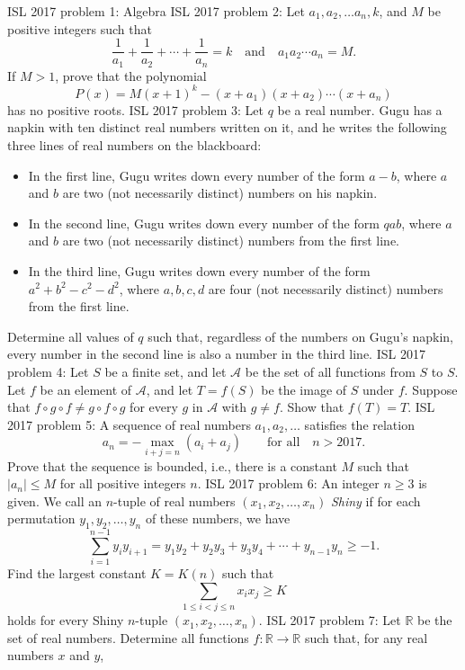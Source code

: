 ISL 2017 problem 1:  Algebra 
ISL 2017 problem 2:  Let $a_1,a_2,\ldots a_n,k$, and $M$ be positive integers such that
\[ \frac{1}{a_1}+\frac{1}{a_2}+\cdots+\frac{1}{a_n}=k\quad\text{and}\quad a_1a_2\cdots a_n=M. \]
If $M>1$, prove that the polynomial
\[ P(x)=M(x+1)^k-(x+a_1)(x+a_2)\cdots (x+a_n) \]
has no positive roots. 
ISL 2017 problem 3:  Let $q$ be a real number. Gugu has a napkin with ten distinct real numbers written on it, and he writes the following three lines of real numbers on the blackboard:
\begin{itemize}
  \item In the first line, Gugu writes down every number of the form $a-b$, where $a$ and $b$ are two (not necessarily distinct) numbers on his napkin.
  \item In the second line, Gugu writes down every number of the form $qab$, where $a$ and $b$ are
two (not necessarily distinct) numbers from the first line.
  \item In the third line, Gugu writes down every number of the form $a^2+b^2-c^2-d^2$, where $a, b, c, d$ are four (not necessarily distinct) numbers from the first line.
\end{itemize}
Determine all values of $q$ such that, regardless of the numbers on Gugu's napkin, every number in the second line is also a number in the third line. 
ISL 2017 problem 4:  Let $S$ be a finite set, and let $\mathcal{A}$ be the set of all functions from $S$ to $S$. Let $f$ be an element of $\mathcal{A}$, and let $T=f(S)$ be the image of $S$ under $f$. Suppose that $f\circ g\circ f\ne g\circ f\circ g$ for every $g$ in $\mathcal{A}$ with $g\ne f$. Show that $f(T)=T$. 
ISL 2017 problem 5:  A sequence of real numbers $a_1,a_2,\ldots$ satisfies the relation
\[ a_n=-\max_{i+j=n}(a_i+a_j)\qquad\text{for all}\quad n>2017. \]
Prove that the sequence is bounded, i.e., there is a constant $M$ such that $|a_n|\leq M$ for all positive integers $n$. 
ISL 2017 problem 6:  An integer $n \geq 3$ is given. We call an $n$-tuple of real numbers $(x_1, x_2, \dots, x_n)$ \textit{Shiny} if for each permutation $y_1, y_2, \dots, y_n$ of these numbers, we have
\[
\sum \limits_{i=1}^{n-1} y_i y_{i+1} = y_1y_2 + y_2y_3 + y_3y_4 + \cdots + y_{n-1}y_n \geq -1.
\]
Find the largest constant $K = K(n)$ such that
\[ \sum \limits_{1 \leq i < j \leq n} x_i x_j \geq K \]
holds for every Shiny $n$-tuple $(x_1, x_2, \dots, x_n)$. 
ISL 2017 problem 7:  Let $\mathbb{R}$ be the set of real numbers. Determine all functions $f: \mathbb{R} \rightarrow \mathbb{R}$ such that, for any real numbers $x$ and $y$,
